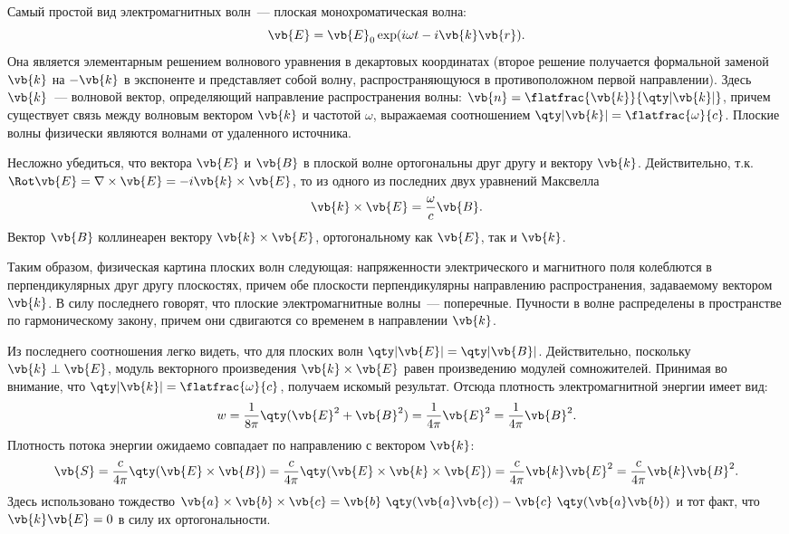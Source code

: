 \documentclass[\docroot/reports/lectures-draft/report.tex]{subfiles}
\begin{document}
    Самый простой вид электромагнитных волн~--- плоская монохроматическая волна:
    \begin{equation*}
        \vb{E} = \vb{E}_0 \exp(i \omega t - i \vb{k}\vb{r}) .
    \end{equation*}
    Она является элементарным решением волнового уравнения в декартовых координатах (второе решение получается формальной заменой $\vb{k}$ на $-\vb{k}$ в экспоненте и представляет собой волну, распространяющуюся в противоположном первой направлении). Здесь $\vb{k}$~--- волновой вектор, определяющий направление распространения волны: $\vb{n} = \flatfrac{\vb{k}}{\qty|\vb{k}|}$, причем существует связь между волновым вектором $\vb{k}$ и частотой $\omega$, выражаемая соотношением $\qty|\vb{k}| = \flatfrac{\omega}{c}$. Плоские волны физически являются волнами от удаленного источника.

    Несложно убедиться, что вектора $\vb{E}$ и $\vb{B}$ в плоской волне ортогональны друг другу и вектору $\vb{k}$. Действительно, т.к. $\Rot \vb{E} = \nabla \times \vb{E} = - i \vb{k} \times \vb{E}$, то из одного из последних двух уравнений Максвелла
    \begin{equation*}
        \vb{k} \times \vb{E} = \frac{\omega}{c} \vb{B} .
    \end{equation*}
    Вектор $\vb{B}$ коллинеарен вектору $\vb{k} \times \vb{E}$, ортогональному как $\vb{E}$, так и $\vb{k}$.

    Таким образом, физическая картина плоских волн следующая: напряженности электрического и магнитного поля колеблются в перпендикулярных друг другу плоскостях, причем обе плоскости перпендикулярны направлению распространения, задаваемому вектором $\vb{k}$. В силу последнего говорят, что плоские электромагнитные волны~--- поперечные. Пучности в волне распределены в пространстве по гармоническому закону, причем они сдвигаются со временем в направлении $\vb{k}$.

    Из последнего соотношения легко видеть, что для плоских волн $\qty|\vb{E}| = \qty|\vb{B}|$. Действительно, поскольку $\vb{k} \perp \vb{E}$, модуль векторного произведения $\vb{k} \times \vb{E}$ равен произведению модулей сомножителей. Принимая во внимание, что $\qty|\vb{k}| = \flatfrac{\omega}{c}$, получаем искомый результат. Отсюда плотность электромагнитной энергии имеет вид:
    \begin{equation*}
        w = \frac{1}{8 \pi} \qty(\vb{E}^2 + \vb{B}^2) = \frac{1}{4 \pi} \vb{E}^2 = \frac{1}{4 \pi} \vb{B}^2 .
    \end{equation*}
    Плотность потока энергии ожидаемо совпадает по направлению с вектором $\vb{k}$:
    \begin{equation*}
        \vb{S} = \frac{c}{4 \pi} \qty(\vb{E} \times \vb{B}) = \frac{c}{4 \pi} \qty(\vb{E} \times \vb{k} \times \vb{E}) = \frac{c}{4 \pi} \vb{k} \vb{E}^2 = \frac{c}{4 \pi} \vb{k} \vb{B}^2 .
    \end{equation*}
    Здесь использовано тождество $\vb{a} \times \vb{b} \times \vb{c} = \vb{b}\ \qty(\vb{a} \vb{c}) - \vb{c}\ \qty(\vb{a} \vb{b})$ и тот факт, что $\vb{k} \vb{E} = 0$ в силу их ортогональности.

\end{document}
